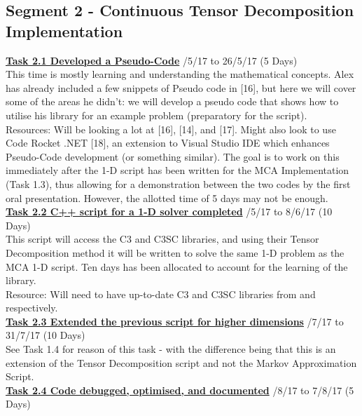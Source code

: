 \documentclass[11pt,draftd]{article}
\begin{document}
\begin{appendices}
	\subsection{Segment 2 - Continuous Tensor Decomposition Implementation}
	\underline{\textbf{Task 2.1 Developed a Pseudo-Code}} /5/17 to 26/5/17 (5 Days) \\
	
	This time is mostly learning and understanding the mathematical concepts.
	Alex has already included a few snippets of Pseudo code in [16], but here we will cover some of the areas he didn’t: we will develop a pseudo code that shows how to utilise his library for an example problem (preparatory for the script). \\
	Resources: Will be looking a lot at [16], [14], and [17]. Might also look to use Code Rocket .NET [18], an extension to Visual Studio IDE which enhances Pseudo-Code development (or something similar). The goal is to work on this immediately after the 1-D script has been written for the MCA Implementation (Task 1.3), thus allowing for a demonstration between the two codes by the first oral presentation. However, the allotted time of 5 days may not be enough.\\
	
	\noindent\underline{\textbf{Task 2.2 C++ script for a 1-D solver completed}} /5/17 to 8/6/17 (10 Days) \\
	
	This script will access the C3 and C3SC libraries, and using their Tensor Decomposition method it will be written to solve the same 1-D problem as the MCA 1-D script. Ten days has been allocated to account for the learning of the library. \\
	Resource: Will need to have up-to-date C3 and C3SC libraries from \cite{c3c} and \cite{c3cs} respectively.\\
	
	\noindent\underline{\textbf{Task 2.3 Extended the previous script for higher dimensions}} /7/17 to 31/7/17 (10 Days) \\
	
	See Task 1.4 for reason of this task - with the difference being that this is an extension of the Tensor Decomposition script and not the Markov Approximation Script.\\
	
	\noindent\underline{\textbf{Task 2.4 Code debugged, optimised, and documented}} /8/17 to 7/8/17 (5 Days) \\
	

\end{appendices}
\end{document}
